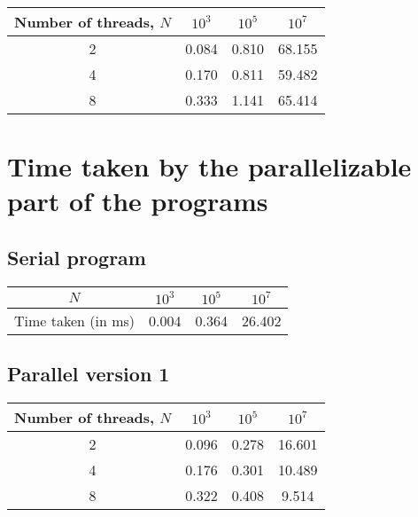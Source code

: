 \documentclass[a4paper]{article}
\begin{document}
\begin{center}
    \begin{tabular}{|c|c|c|c|}
        \hline
        Number of threads, $N$ & $10^3$ & $10^5$ & $10^7$ \\
        \hline
        2  & 0.084 & 0.810 & 68.155 \\
        \hline
        4  & 0.170 & 0.811 & 59.482 \\
        \hline
        8  & 0.333 & 1.141 & 65.414 \\
        \hline
    \end{tabular}
\end{center}

\section{Time taken by the parallelizable part of the programs}

\subsection{Serial program}

\begin{center}
    \begin{tabular}{|c|c|c|c|}
        \hline
        $N$ & $10^3$ & $10^5$ & $10^7$ \\
        \hline
        Time taken (in ms) & 0.004 & 0.364 & 26.402 \\
        \hline
    \end{tabular}
\end{center}

\subsection{Parallel version 1}

\begin{center}
    \begin{tabular}{|c|c|c|c|}
        \hline
        Number of threads, $N$ & $10^3$ & $10^5$ & $10^7$ \\
        \hline
        2  & 0.096 & 0.278 & 16.601 \\
        \hline
        4  & 0.176 & 0.301 & 10.489 \\
        \hline
        8  & 0.322 & 0.408 & 9.514 \\
        \hline
    \end{tabular}
\end{center}
\end{document}
